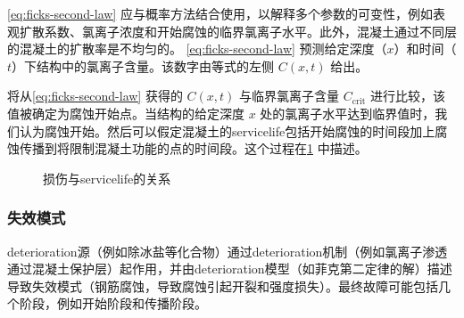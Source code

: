 \cref{eq:ficks-second-law} 应与概率方法结合使用，以解释多个参数的可变性，例如表观扩散系数、氯离子浓度和开始腐蚀的临界氯离子水平。此外，混凝土通过不同层的混凝土的扩散率是不均匀的。 \cref{eq:ficks-second-law} 预测给定深度（$x$）和时间（$t$）下结构中的氯离子含量。该数字由等式的左侧 $C(x,t)$ 给出。


将从\cref{eq:ficks-second-law} 获得的 $C(x,t)$ 与临界氯离子含量 $C_\text{crit}$ 进行比较，该值被确定为腐蚀开始点。当结构的给定深度 $x$ 处的氯离子水平达到临界值时，我们认为腐蚀开始。然后可以假定混凝土的\gls{servicelife}包括开始腐蚀的时间段加上腐蚀传播到将限制混凝土功能的点的时间段。这个过程在\cref{fig:damage-service-life} 中描述。

\begin{figure}
  \caption{损伤与\gls*{servicelife}的关系}
  \label{fig:damage-service-life}
\end{figure}

\subsubsection*{失效模式}
\gls*{deterioration}源（例如除冰盐等化合物）通过\gls*{deterioration}机制（例如氯离子渗透通过混凝土保护层）起作用，并由\gls*{deterioration}模型（如菲克第二定律的解）描述导致失效模式（钢筋腐蚀，导致腐蚀引起开裂和强度损失）。最终故障可能包括几个阶段，例如开始阶段和传播阶段。

